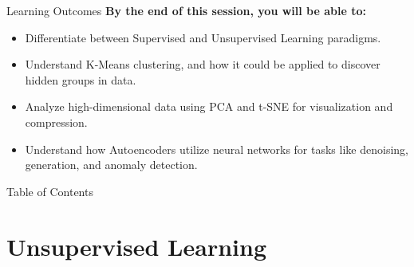 \begin{frame}{Learning Outcomes}
\textbf{By the end of this session, you will be able to:}

\vspace{1em}
\begin{itemize}\setlength\itemsep{1em}
    \item Differentiate between Supervised and Unsupervised Learning paradigms.
    \item Understand K-Means clustering, and how it could be applied to discover hidden groups in data.
    \item Analyze high-dimensional data using PCA and t-SNE for visualization and compression.
    \item Understand how Autoencoders utilize neural networks for tasks like denoising, generation, and anomaly detection.
\end{itemize}

\end{frame}

\begin{frame}{Table of Contents}
    \tableofcontents
\end{frame}


\section{Unsupervised Learning}

